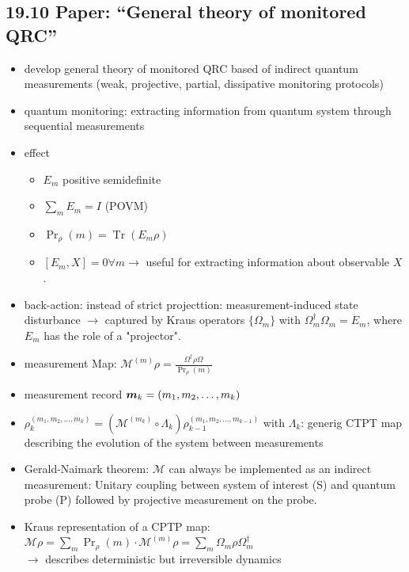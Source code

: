 \subsection*{19.10 \quad Paper: ``General theory of monitored QRC''}
\begin{itemize}
    \item develop general theory of monitored QRC based of indirect quantum measurements (weak, projective, partial, dissipative monitoring protocols)
    \item quantum monitoring: extracting information from quantum system through sequential measurements
    \item effect
    \begin{itemize}
        \item $E_m$ positive semidefinite
        \item $\sum_m E_m = I$ (POVM)
        \item $\operatorname{Pr}_\rho(m) = \operatorname{Tr}(E_m \rho)$
        \item $[E_m, X] = 0 \forall m \to$ useful for extracting information about observable $X$.
    \end{itemize}
    \item back-action: instead of strict projecttion: measurement-induced state disturbance $\to$ captured by Kraus operators $\{\Omega_m\}$ with $\Omega_m^\dagger \Omega_m = E_m$, where $E_m$ has the role of a "projector".
    \item measurement Map: $\mathcal{M}^{(m)}\rho = \frac{\Omega^\dagger \rho \Omega}{\operatorname{Pr}_\rho(m)}$
    \item measurement record ${\bm{m}}_{k} = (m_1, m_2, \ldots, m_k)$
    \item $\rho_k^{(m_1, m_2, \ldots, m_k)} = (\mathcal{M}^{(m_k)} \circ \Lambda_k) \rho_{k-1}^{(m_1, m_2, \ldots, m_{k-1})} $ with $\Lambda_k$: generig CTPT map describing the evolution of the system between measurements
    \item Gerald-Naimark theorem: $\mathcal{M}$ can always be implemented as an indirect measurement: Unitary coupling between system of interest (S) and quantum probe (P) followed by projective measurement on the probe.
    \item Kraus representation of a CPTP map: \\
    $\mathcal{M}\rho = \sum_m \operatorname{Pr}_\rho (m) \cdot \mathcal{M}^{(m)}\rho = \sum_m \Omega_m \rho \Omega_m^\dagger $ \\
    $\to$ describes deterministic but irreversible dynamics

\end{itemize}
